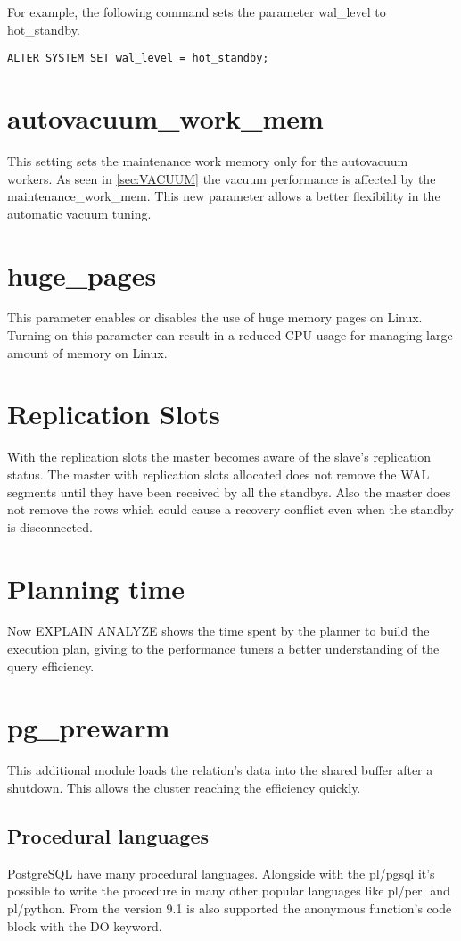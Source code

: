 For example, the following command sets the parameter wal\_level to hot\_standby. 
\begin{lstlisting}[style=pgsql]
 ALTER SYSTEM SET wal_level = hot_standby;

\end{lstlisting}

\section{autovacuum\_work\_mem}
This setting sets the maintenance work memory only for the autovacuum workers. As seen in
\ref{sec:VACUUM} the vacuum performance is affected by the maintenance\_work\_mem. This new
parameter allows a better flexibility in the automatic vacuum tuning.


\section{huge\_pages}
This parameter enables or disables the use of huge memory pages on Linux. Turning on this parameter can
result in a reduced CPU usage for managing large amount of memory on Linux.

\section{Replication Slots}
With the replication slots the master becomes aware of the slave's replication status. The master
with replication slots allocated does not remove the WAL segments until they have been received by all
the standbys. Also the master does not remove the rows which could cause a recovery conflict even when
the standby is disconnected. 

\section{Planning time}
Now EXPLAIN ANALYZE shows the time spent by the planner to build the execution plan, giving to the
performance tuners a better understanding of the query efficiency.

\section{pg\_prewarm}
This additional module loads the relation's data into the shared buffer after a shutdown. This allows
the cluster reaching the efficiency quickly.

\subsection{Procedural languages}
PostgreSQL have many procedural languages. Alongside with the pl/pgsql it's possible to write the 
procedure in many other popular languages like pl/perl and pl/python. From the version 9.1 is also 
supported the anonymous function's code block with the DO keyword.

